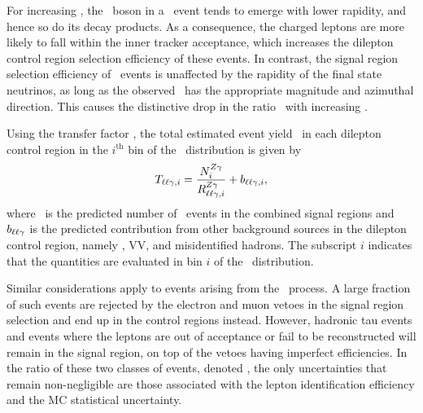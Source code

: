 For increasing \ETg, the \PZ\ boson in a \zllg\ event tends to emerge with lower rapidity, and hence so do its decay products. 
As a consequence, the charged leptons are more likely to fall within the inner tracker acceptance, which increases the dilepton control region selection efficiency of these events. 
In contrast, the signal region selection efficiency of \zinvg\ events is unaffected by the rapidity of the final state neutrinos, as long as the observed \met\ has the appropriate magnitude and azimuthal direction. 
This causes the distinctive drop in the ratio \RZll\ with increasing \ETg.

Using the transfer factor \RZll, the total estimated event yield \Tll\ in each dilepton control region in the $i^\mathrm{th}$ bin of the \ETg\ distribution is given by
\begin{equation}
  \Tll[,i] = \frac{\NZg[i]}{\RZll[,i]} + b_{\ell\ell\Pgg,i},
\end{equation}
where \NZg\ is the predicted number of \zinvg\ events in the combined signal regions and $b_{\ell\ell\Pgg}$ is the predicted contribution from other background sources in the dilepton control region, namely \ttg, VV\Pgg, and misidentified hadrons. 
The subscript $i$ indicates that the quantities are evaluated in bin $i$ of the \ETg\ distribution.

Similar considerations apply to events arising from the \wlng\ process. 
A large fraction of such events are rejected by the electron and muon vetoes in the signal region selection and end up in the control regions instead. 
However, hadronic tau events and events where the leptons are out of acceptance or fail to be reconstructed will remain in the signal region, on top of the vetoes having imperfect efficiencies. 
In the ratio of these two classes of events, denoted \RWl, the only uncertainties that remain non-negligible are those associated with the lepton identification efficiency and the MC statistical uncertainty.


